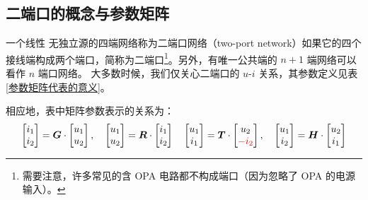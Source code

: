 \documentclass[UTF8]{report}
\theoremstyle{MyLineTheoremStyle} %
\theoremstyle{MyBlockTheoremStyle} %
\theoremstyle{MySubsubsectionStyle} %
\begin{document}
\subsection{二端口的概念与参数矩阵}


一个线性{\color{red} 无独立源}的四端网络称为二端口网络（two-port network）如果它的四个接线端构成两个端口，简称为二端口\footnote{需要注意，许多常见的含 OPA 电路都不构成端口（因为忽略了 OPA 的电源输入）。}。另外，有唯一公共端的 $n+1$ 端网络可以看作 $n$ 端口网络。
大多数时候，我们仅关心二端口的 $u$-$i$ 关系，其参数定义见表 \ref{参数矩阵代表的意义}。

相应地，表中矩阵参数表示的关系为：
\begin{gather}
\begin{bmatrix}
    i_1\\
    i_2\\
\end{bmatrix}
= 
\boldsymbol{G}
\cdot
\begin{bmatrix}
    u_1\\ 
    u_2\\
\end{bmatrix}
,\quad 
\begin{bmatrix}
    u_1\\
    u_2\\
\end{bmatrix}
= 
\boldsymbol{R}
\cdot
\begin{bmatrix}
    i_1\\ 
    i_2\\
\end{bmatrix}\quad 
\begin{bmatrix}
    u_1\\
    i_1\\
\end{bmatrix}
= 
\boldsymbol{T}
\cdot
\begin{bmatrix}
    u_2\\ 
    {\color{red} -i_2}\\
\end{bmatrix} 
,\quad 
\begin{bmatrix}
    u_1\\
    i_2\\
\end{bmatrix}
= 
\boldsymbol{H}
\cdot
\begin{bmatrix}
    u_2\\ 
    i_1\\
\end{bmatrix}
\end{gather}
\end{document}
